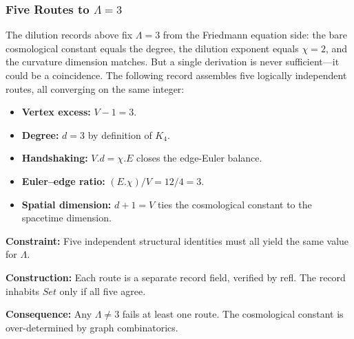 \documentclass[11pt,a4paper]{book}
\def\cdot{.}%
\def\texttt#1{#1}%
\begin{document}
\subsubsection*{Five Routes to $\Lambda = 3$}

The dilution records above fix $\Lambda = 3$ from the Friedmann
equation side: the bare cosmological constant equals the degree, the
dilution exponent equals $\chi = 2$, and the curvature dimension
matches. But a single derivation is never sufficient---it could be
a coincidence. The following record assembles five logically
independent routes, all converging on the same integer:

\begin{itemize}
  \item \textbf{Vertex excess:} $V - 1 = 3$.
  \item \textbf{Degree:} $d = 3$ by definition of $K_4$.
  \item \textbf{Handshaking:} $V \cdot d = \chi \cdot E$
        closes the edge-Euler balance.
  \item \textbf{Euler--edge ratio:} $(E \cdot \chi)/V = 12/4 = 3$.
  \item \textbf{Spatial dimension:} $d + 1 = V$ ties the
        cosmological constant to the spacetime dimension.
\end{itemize}

\textbf{Constraint:} Five independent structural identities must
all yield the same value for $\Lambda$.

\textbf{Construction:} Each route is a separate record field,
verified by \texttt{refl}. The record inhabits $\mathit{Set}$
only if all five agree.

\textbf{Consequence:} Any $\Lambda \neq 3$ fails at least one
route. The cosmological constant is over-determined by graph
combinatorics.
\end{document}
